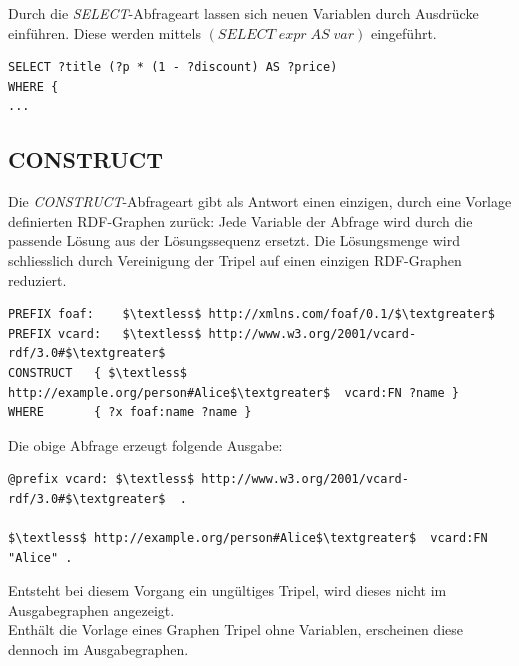 Durch die \textit{SELECT}-Abfrageart lassen sich neuen Variablen durch Ausdrücke einführen. Diese werden mittels $(SELECT \; expr \; AS \; var)$ eingeführt.

\begin{lstlisting}
SELECT ?title (?p * (1 - ?discount) AS ?price)
WHERE {
...
\end{lstlisting}


\subsection{CONSTRUCT}
\label{subsec:sparql_abfragearten_construct}
Die \textit{CONSTRUCT}-Abfrageart gibt als Antwort einen einzigen, durch eine Vorlage definierten RDF-Graphen zurück: Jede Variable der Abfrage wird durch die passende Lösung aus der Lösungssequenz ersetzt. Die Lösungsmenge wird schliesslich durch Vereinigung der Tripel auf einen einzigen RDF-Graphen reduziert.

\begin{lstlisting}
PREFIX foaf:    $\textless$ http://xmlns.com/foaf/0.1/$\textgreater$ 
PREFIX vcard:   $\textless$ http://www.w3.org/2001/vcard-rdf/3.0#$\textgreater$ 
CONSTRUCT   { $\textless$ http://example.org/person#Alice$\textgreater$  vcard:FN ?name }
WHERE       { ?x foaf:name ?name }
\end{lstlisting}

Die obige Abfrage erzeugt folgende Ausgabe:
\begin{lstlisting}
@prefix vcard: $\textless$ http://www.w3.org/2001/vcard-rdf/3.0#$\textgreater$  .

$\textless$ http://example.org/person#Alice$\textgreater$  vcard:FN "Alice" .
\end{lstlisting}

Entsteht bei diesem Vorgang ein ungültiges Tripel, wird dieses nicht im Ausgabegraphen angezeigt.\\
Enthält die Vorlage eines Graphen Tripel ohne Variablen, erscheinen diese dennoch im Ausgabegraphen.

